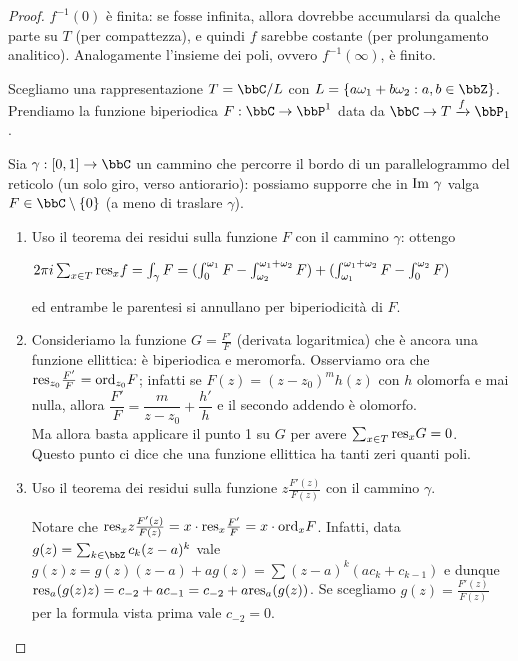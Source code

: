 
\begin{proof}
$f^{-1}(0)$ è finita: se fosse infinita, allora dovrebbe accumularsi da qualche parte su $T$ (per compattezza), e quindi $f$ sarebbe costante (per prolungamento analitico).
Analogamente l'insieme dei poli, ovvero $f^{-1}(\infty)$, è finito.

Scegliamo una rappresentazione $T=\bbC/L$ con $L=\{a\omega_1+b\omega_2 : a,b\in\bbZ\}$. Prendiamo la funzione biperiodica $F:\bbC\rar\bbP^1$ data da $\bbC\rar T\xrightarrow{f}\bbP_1$.

Sia $\gamma:[0,1]\rar\bbC$ un cammino che percorre il bordo di un parallelogrammo del reticolo (un solo giro, verso antiorario):
possiamo supporre che in $\text{Im }\gamma$ valga $F\in\bbC\setminus\{0\}$ (a meno di traslare $\gamma$).

\begin{enumerate}
    \item Uso il teorema dei residui sulla funzione $F$ con il cammino $\gamma$: ottengo

    $2\pi i\sum_{x\in T}\text{res}_xf=\int_\gamma F=(\int_0^{\omega_1}F-\int_{\omega_2}^{\omega_1+\omega_2}F)+(\int_{\omega_1}^{\omega_1+\omega_2}F-\int_{0}^{\omega_2}F)$

    ed entrambe le parentesi si annullano per biperiodicità di $F$.


    \item Consideriamo la funzione $G=\frac{F'}{F}$ (derivata logaritmica) che è ancora una funzione ellittica: è biperiodica e meromorfa. Osserviamo ora che $\text{res}_{z_0}\frac{F'}{F}=\text{ord}_{z_0}F$; infatti se $F(z)=(z-z_0)^mh(z)$ con $h$ olomorfa e mai nulla, allora $\dfrac{F'}{F}=\dfrac{m}{z-z_0}+\dfrac{h'}{h}$ e il secondo addendo è olomorfo.\\
    Ma allora basta applicare il punto 1 su $G$ per avere $\sum_{x\in T}\text{res}_x G=0$.\\
    Questo punto ci dice che una funzione ellittica ha tanti zeri quanti poli.

    \item Uso il teorema dei residui sulla funzione $z\frac{F'(z)}{F(z)}$ con il cammino $\gamma$.

    Notare che $\text{res}_xz\frac{F'(z)}{F(z)}=x\cdot\text{res}_x\frac{F'}{F}=x\cdot\text{ord}_xF$.
    Infatti, data $g(z) = \sum_{k \in \bbZ} c_k (z - a)^k$ vale $g(z)z=g(z)(z-a)+ag(z)=\sum (z-a)^k(ac_k+c_{k-1})$ e dunque $\text{res}_a (g(z)z) = c_{-2} + a c_{-1} = c_{-2} + a\text{res}_a(g(z))$.
    Se scegliamo $g(z) = \frac{F'(z)}{F(z)}$ per la formula vista prima vale $c_{-2} = 0$.


\end{enumerate}
\end{proof}
